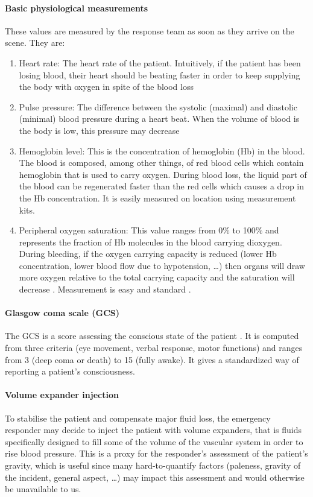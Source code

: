 \paragraph{Basic physiological measurements}
These values are measured by the response team as soon as they arrive on the scene. They are:
\begin{enumerate}
\item Heart rate: The heart rate of the patient. Intuitively, if the patient has been losing blood, their heart should be beating faster in order to keep supplying the body with oxygen in spite of  the blood loss \cite{HS_HR}
\item Pulse pressure: The difference between the systolic (maximal) and diastolic (minimal) blood pressure during a heart beat. When the volume of blood is the body is low, this pressure may decrease \cite{HS_pressure}
\item Hemoglobin level: This is the concentration of hemoglobin (Hb) in the blood. The blood is composed, among other things, of red blood cells which contain hemoglobin that is used to carry oxygen. During blood loss, the liquid part of the blood can be regenerated faster than the red cells \cite{hemorrhage_regen} which causes a drop in the Hb concentration. It is easily measured on location using measurement kits.
\item Peripheral oxygen saturation: This value ranges from 0\% to 100\% and represents the fraction of Hb molecules in the blood carrying dioxygen. During bleeding, if the oxygen carrying capacity is reduced (lower Hb concentration, lower blood flow due to hypotension, \ldots) then organs will draw more oxygen  relative to the total carrying capacity and the saturation will decrease \cite{HS_saturation}. Measurement is easy and standard \cite{Pulse_oximetry}.
\end{enumerate}

\paragraph{Glasgow coma scale (GCS)}
The GCS is a score assessing the conscious state of the patient \cite{GCS}. It is computed from three criteria (eye movement, verbal response, motor functions) and ranges from 3 (deep coma or death) to 15 (fully awake). It gives a standardized way of reporting a patient's consciousness.

\paragraph{Volume expander injection}
To stabilise the patient and compensate major fluid loss, the emergency responder may decide to inject the patient with volume expanders, that is fluids specifically designed to fill some of the volume of the vascular system in order to rise blood pressure. This is a proxy for the responder's assessment of the patient's gravity, which is useful since many hard-to-quantify factors (paleness, gravity of the incident, general aspect, \ldots) may impact this assessment and would otherwise be unavailable to us.

